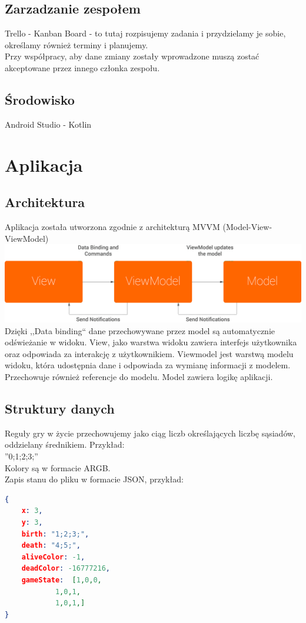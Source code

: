 \documentclass[12pt,a4paper]{article}
\begin{document}
\subsection{Zarzadzanie zespołem}
Trello - Kanban Board - to tutaj rozpisujemy zadania i przydzielamy je sobie, określamy również terminy i planujemy.\\

Przy współpracy, aby dane zmiany zostały wprowadzone muszą zostać akceptowane przez innego członka zespołu.
\subsection{Środowisko}
Android Studio - Kotlin \\
\section{Aplikacja}
\subsection{Architektura}
Aplikacja została utworzona zgodnie z architekturą MVVM (Model-View-ViewModel)\\
\includegraphics[width=1\textwidth]{Images/mvvm.png}\\
Dzięki ,,Data binding`` dane przechowywane przez model są automatycznie odświeżanie w widoku. View, jako warstwa widoku zawiera interfejs użytkownika oraz odpowiada za interakcję z użytkownikiem. Viewmodel jest warstwą modelu widoku, która udostępnia dane i odpowiada za wymianę informacji z modelem. Przechowuje również referencje do modelu. Model zawiera logikę aplikacji.
\subsection{Struktury danych}
Reguły gry w życie przechowujemy jako ciąg liczb określających liczbę sąsiadów, oddzielany średnikiem. Przykład: \\
''0;1;2;3;'' \\
Kolory są w formacie ARGB. \\
Zapis stanu do pliku w formacie JSON, przykład:\\ 
\begin{lstlisting}[language=json]
{ 
	x: 3,
	y: 3,
	birth: "1;2;3;",
	death: "4;5;",
	aliveColor: -1,
	deadColor: -16777216,
	gameState: 	[1,0,0,
			1,0,1,
			1,0,1,]
}
\end{lstlisting}
\end{document}
